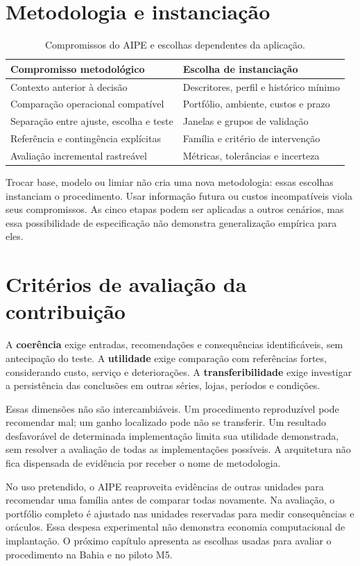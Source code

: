 \section{Metodologia e instanciação}
\begin{table}[htbp]\centering\small
\caption{Compromissos do AIPE e escolhas dependentes da aplicação.}\label{tab:metodo_instancia}
\begin{tabular}{@{}p{5.6cm}p{7cm}@{}}\toprule
Compromisso metodológico & Escolha de instanciação\\\midrule
Contexto anterior à decisão & Descritores, perfil e histórico mínimo\\
Comparação operacional compatível & Portfólio, ambiente, custos e prazo\\
Separação entre ajuste, escolha e teste & Janelas e grupos de validação\\
Referência e contingência explícitas & Família e critério de intervenção\\
Avaliação incremental rastreável & Métricas, tolerâncias e incerteza\\\bottomrule
\end{tabular}\end{table}

Trocar base, modelo ou limiar não cria uma nova metodologia: essas escolhas instanciam o procedimento. Usar informação futura ou custos incompatíveis viola seus compromissos. As cinco etapas podem ser aplicadas a outros cenários, mas essa possibilidade de especificação não demonstra generalização empírica para eles.

\section{Critérios de avaliação da contribuição}
A \textbf{coerência} exige entradas, recomendações e consequências identificáveis, sem antecipação do teste. A \textbf{utilidade} exige comparação com referências fortes, considerando custo, serviço e deteriorações. A \textbf{transferibilidade} exige investigar a persistência das conclusões em outras séries, lojas, períodos e condições.

Essas dimensões não são intercambiáveis. Um procedimento reproduzível pode recomendar mal; um ganho localizado pode não se transferir. Um resultado desfavorável de determinada implementação limita sua utilidade demonstrada, sem resolver a avaliação de todas as implementações possíveis. A arquitetura não fica dispensada de evidência por receber o nome de metodologia.

No uso pretendido, o AIPE reaproveita evidências de outras unidades para recomendar uma família antes de comparar todas novamente. Na avaliação, o portfólio completo é ajustado nas unidades reservadas para medir consequências e oráculos. Essa despesa experimental não demonstra economia computacional de implantação. O próximo capítulo apresenta as escolhas usadas para avaliar o procedimento na Bahia e no piloto M5.

